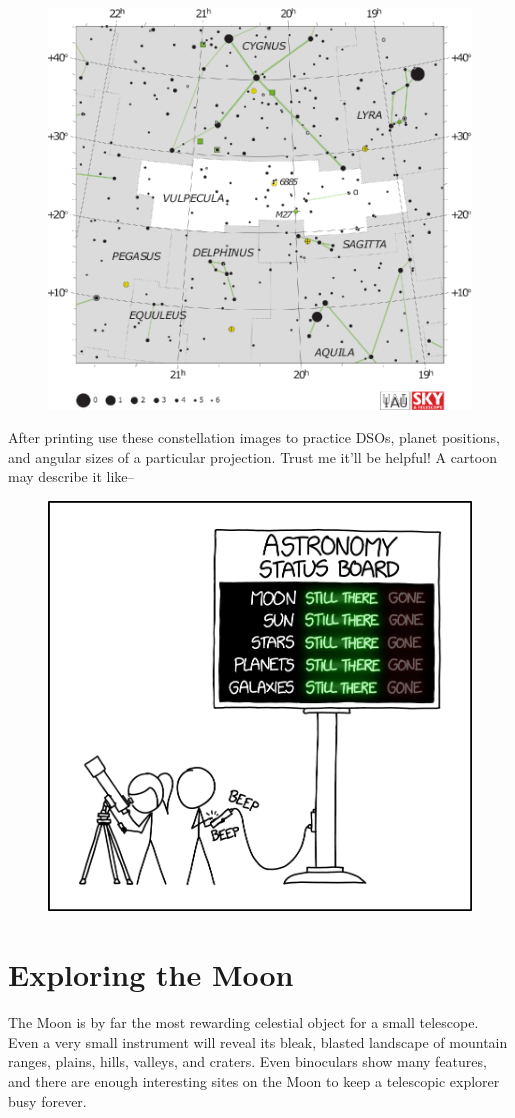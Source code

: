 \documentclass[a4paper,12pt]{extarticle}
\begin{document}
\clearpage
\begin{figure}[H]
	\centering
	\includegraphics[width=0.5\linewidth]{C23.eps}
\end{figure}
\vspace{1.5cm}
After printing use these constellation images to practice DSOs, planet positions, and angular sizes of a particular projection. Trust me it'll be helpful! A cartoon may describe it like--
\begin{figure}[H]
	\centering
	\includegraphics[width=0.5\linewidth]{statusb.png}
\end{figure}
\clearpage
\section{Exploring the Moon}
The Moon is by far the most rewarding celestial object for a small telescope. Even a very small instrument will reveal its bleak, blasted landscape of mountain ranges, plains, hills, valleys, and craters. Even binoculars show many features, and there are enough interesting sites on the Moon to keep a telescopic explorer busy forever.
\end{document}
